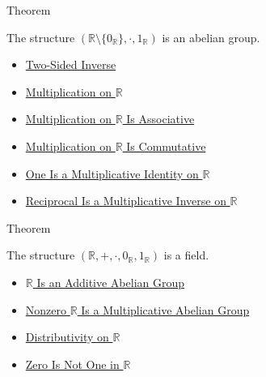 \begin{theorembox}{Theorem}
\begin{theorem}
\label{thm:r-nonzero-multiplicative-abelian-group}
The structure $(\mathbb{R}\setminus\{0_{\mathbb{R}}\},\cdot,1_{\mathbb{R}})$
is an abelian group.
\end{theorem}
\end{theorembox}

\begin{dependencies}
\begin{itemize}
  \item \hyperref[def:two-sided-inverse]{Two-Sided Inverse}
  \item \hyperref[def:multiplication-on-r]{Multiplication on $\mathbb{R}$}
  \item \hyperref[thm:multiplication-on-r-associative]{Multiplication on $\mathbb{R}$ Is Associative}
  \item \hyperref[thm:multiplication-on-r-commutative]{Multiplication on $\mathbb{R}$ Is Commutative}
  \item \hyperref[thm:one-multiplicative-identity-on-r]{One Is a Multiplicative Identity on $\mathbb{R}$}
  \item \hyperref[thm:reciprocal-multiplicative-inverse-on-r]{Reciprocal Is a Multiplicative Inverse on $\mathbb{R}$}
\end{itemize}
\end{dependencies}

\begin{theorembox}{Theorem}
\begin{theorem}
\label{thm:r-is-a-field}
The structure $(\mathbb{R},+,\cdot,0_{\mathbb{R}},1_{\mathbb{R}})$ is a field.
\end{theorem}
\end{theorembox}

\begin{dependencies}
\begin{itemize}
  \item \hyperref[thm:r-additive-abelian-group]{$\mathbb{R}$ Is an Additive Abelian Group}
  \item \hyperref[thm:r-nonzero-multiplicative-abelian-group]{Nonzero $\mathbb{R}$ Is a Multiplicative Abelian Group}
  \item \hyperref[thm:distributivity-on-r]{Distributivity on $\mathbb{R}$}
  \item \hyperref[thm:zero-not-one-in-r]{Zero Is Not One in $\mathbb{R}$}
\end{itemize}
\end{dependencies}

